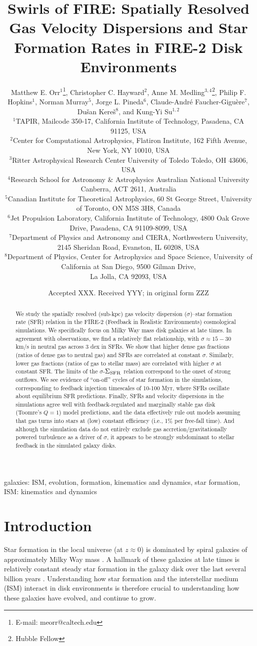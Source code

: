 \documentclass[usletter,fleqn,usenatbib]{mnras}
\title[Gas Velocity Dispersions and SFRs in FIRE Disks]{Swirls of FIRE: Spatially Resolved Gas Velocity Dispersions and Star Formation Rates in FIRE-2 Disk Environments}
\author[M. E. Orr et al.]{Matthew E. Orr$^{1}$\thanks{E-mail: meorr@caltech.edu},  
Christopher C. Hayward$^{2}$, 
Anne M. Medling$^{3,4}$\thanks{Hubble Fellow}, \newauthor
Philip F. Hopkins$^{1}$,
Norman Murray$^5$,
Jorge L. Pineda$^6$, \newauthor
 Claude-Andr\'e Faucher-Gigu\`{e}re$^{7}$, 
 Du\v{s}an Kere\v{s}$^{8}$,  
and Kung-Yi Su$^{1,2}$\\
$^{1}$TAPIR, Mailcode 350-17, California Institute of Technology, Pasadena, CA 91125, USA\\
$^{2}$Center for Computational Astrophysics, Flatiron Institute, 162 Fifth Avenue, New York, NY 10010, USA\\
$^{3}$Ritter Astrophysical Research Center University of Toledo Toledo, OH 43606, USA\\
$^{4}$Research School for Astronomy \& Astrophysics Australian National University Canberra, ACT 2611, Australia\\
$^{5}$Canadian Institute for Theoretical Astrophysics, 60 St George Street, University of Toronto, ON M5S 3H8, Canada\\
$^{6}$Jet Propulsion Laboratory, California Institute of Technology, 4800 Oak Grove Drive, Pasadena, CA 91109-8099, USA\\
$^{7}$Department of Physics and Astronomy and CIERA, Northwestern University, 2145 Sheridan Road, Evanston, IL 60208, USA\\
$^{8}$Department of Physics, Center for Astrophysics and Space Science, University of California at San Diego, 9500 Gilman Drive, \\ La Jolla, CA 92093, USA\\
}
\date{Accepted XXX. Received YYY; in original form ZZZ}
\begin{document}
\label{firstpage}
\pagerange{\pageref{firstpage}--\pageref{lastpage}}
\maketitle

\begin{abstract}
We study the spatially resolved (sub-kpc) gas velocity dispersion ($\sigma$)--star formation rate (SFR) relation in the FIRE-2 (Feedback in Realistic Environments) cosmological simulations.  We specifically focus on Milky Way mass disk galaxies at late times.  In agreement with observations, we find a relatively flat relationship, with $\sigma \approx 15-30$ km/s in neutral gas across 3 dex in SFRs.  We show that higher dense gas fractions (ratios of dense gas to neutral gas) and SFRs are correlated at constant $\sigma$. Similarly, lower gas fractions (ratios of gas to stellar mass) are correlated with higher $\sigma$ at constant SFR. The limits of the $\sigma$-$\Sigma_{\rm SFR}$ relation correspond to the onset of strong outflows.   We see evidence of ``on-off'' cycles of star formation in the simulations, corresponding to feedback injection timescales of 10-100 Myr, where SFRs oscillate about equilibrium SFR predictions. Finally, SFRs and velocity dispersions in the simulations agree well with feedback-regulated and marginally stable gas disk (Toomre's $Q =1$) model predictions, and the data effectively rule out models assuming that gas turns into stars at (low) constant efficiency (i.e., 1\% per free-fall time).  And although the simulation data do not entirely exclude gas accretion/gravitationally powered turbulence as a driver of $\sigma$, it appears to be strongly subdominant to stellar feedback in the simulated galaxy disks.
\end{abstract}

\begin{keywords}
galaxies: ISM, evolution, formation, kinematics and dynamics, star formation, ISM: kinematics and dynamics
\end{keywords}





\section{Introduction}\label{sec:intro}

Star formation in the local universe (at $z \approx 0$) is dominated by spiral galaxies of approximately Milky Way mass \citep[stellar masses of $\sim 10^{10} - 10^{11}$ M$_\odot$,][]{Brinchmann2004, Behroozi2013}.  A hallmark of these galaxies at late times is relatively constant steady star formation in the galaxy disk over the last several billion years \citep{Ma2017, Simons2017}. Understanding how star formation and the interstellar medium (ISM) interact in disk environments is therefore crucial to understanding how these galaxies have evolved, and continue to grow. 
\end{document}
